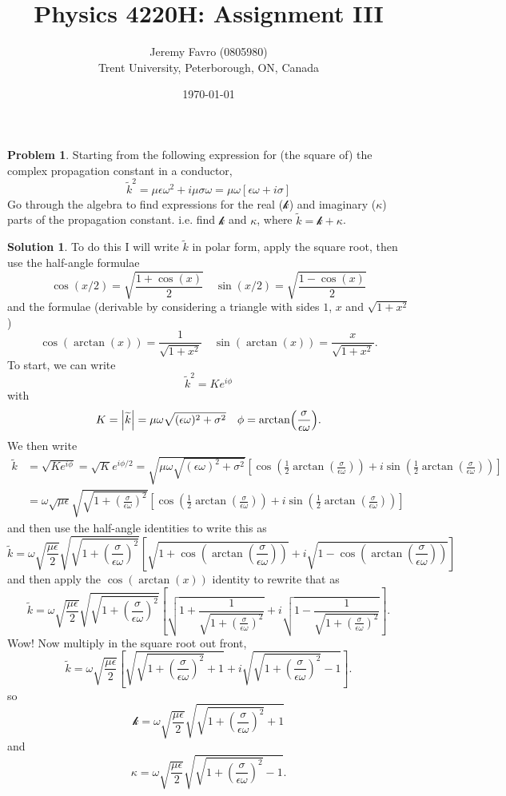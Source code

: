 \documentclass[10pt]{article}
\title{Physics 4220H: Assignment III}
\author{Jeremy Favro (0805980) \\ Trent University, Peterborough, ON, Canada}
\date{\today}
\theoremstyle{definition}
\newtheorem{problem}{Problem}
\newtheorem{soln}{Solution}
\newcommand{\ti}[1]{\widetilde{#1}}
\begin{document}
\maketitle

\begin{problem}
Starting from the following expression for (the square of) the complex
propagation constant in a conductor,
$$
  \ti{k}^2=\mu\epsilon\omega^2+i\mu\sigma\omega=\mu\omega\left[\epsilon\omega+i\sigma\right]
$$
Go through the algebra to find expressions for the real ($\mathcal{k}$) and imaginary ($\kappa$) parts
of the propagation constant. i.e. find $\mathcal{k}$ and $\kappa$, where
$\ti{k}=\mathcal{k}+\kappa$.
\end{problem}
\begin{soln}
  To do this I will write $\ti{k}$ in polar form, apply the square root, then use
  the half-angle formulae
  $$\cos(x/2)=\sqrt{\frac{1+\cos(x)}{2}}\quad\sin(x/2)=\sqrt{\frac{1-\cos(x)}{2}}$$
  and the formulae (derivable by considering a triangle with sides $1$, $x$ and $\sqrt{1+x^2}$)
  $$\cos(\arctan(x))=\frac{1}{\sqrt{1+x^2}}\quad\sin(\arctan(x))=\frac{x}{\sqrt{1+x^2}}.$$
  To start, we can write
  $$\ti{k}^2=Ke^{i\phi}$$
  with
  $$K=\abs{\ti{k}}=\mu\omega\sqrt{(\epsilon\omega)^2+\sigma^2}\quad \phi=\arctan(\frac{\sigma}{\epsilon \omega}).$$
  We then write
  \begin{align*}
    \ti{k} & =\sqrt{Ke^{i\phi}}=\sqrt{K}e^{i\phi/2}=\sqrt{\mu\omega\sqrt{(\epsilon\omega)^2+\sigma^2}}\left[\cos(\frac{1}{2}\arctan(\frac{\sigma}{\epsilon \omega}))+i\sin(\frac{1}{2}\arctan(\frac{\sigma}{\epsilon \omega}))\right] \\
           & =\omega\sqrt{\mu\epsilon}\sqrt{\sqrt{1+\left(\frac{\sigma}{\epsilon\omega}\right)^2}}\left[\cos(\frac{1}{2}\arctan(\frac{\sigma}{\epsilon \omega}))+i\sin(\frac{1}{2}\arctan(\frac{\sigma}{\epsilon \omega}))\right]
  \end{align*}
  and then use the half-angle identities to write this as
  $$
    \ti{k}=\omega\sqrt{\frac{\mu\epsilon}{2}}\sqrt{\sqrt{1+\left(\frac{\sigma}{\epsilon\omega}\right)^2}}\left[\sqrt{1+\cos(\arctan(\frac{\sigma}{\epsilon \omega}))}+i\sqrt{1-\cos(\arctan(\frac{\sigma}{\epsilon \omega}))}\right]
  $$
  and then apply the $\cos(\arctan(x))$ identity to rewrite that as
  $$
    \ti{k}=\omega\sqrt{\frac{\mu\epsilon}{2}}\sqrt{\sqrt{1+\left(\frac{\sigma}{\epsilon\omega}\right)^2}}\left[\sqrt{1+\frac{1}{\sqrt{1+\left(\frac{\sigma}{\epsilon \omega}\right)^2}}}+i\sqrt{1-\frac{1}{\sqrt{1+\left(\frac{\sigma}{\epsilon \omega}\right)^2}}}\right].
  $$
  Wow! Now multiply in the square root out front,
  $$
    \ti{k}=\omega\sqrt{\frac{\mu\epsilon}{2}}\left[\sqrt{\sqrt{1+\left(\frac{\sigma}{\epsilon\omega}\right)^2}+1}+i\sqrt{\sqrt{1+\left(\frac{\sigma}{\epsilon\omega}\right)^2}-1}\right].
  $$
  so
  $$\mathcal{k}=\omega\sqrt{\frac{\mu\epsilon}{2}}\sqrt{\sqrt{1+\left(\frac{\sigma}{\epsilon\omega}\right)^2}+1}$$
  and
  $$\kappa=\omega\sqrt{\frac{\mu\epsilon}{2}}\sqrt{\sqrt{1+\left(\frac{\sigma}{\epsilon\omega}\right)^2}-1}.$$
\end{soln}
\end{document}

